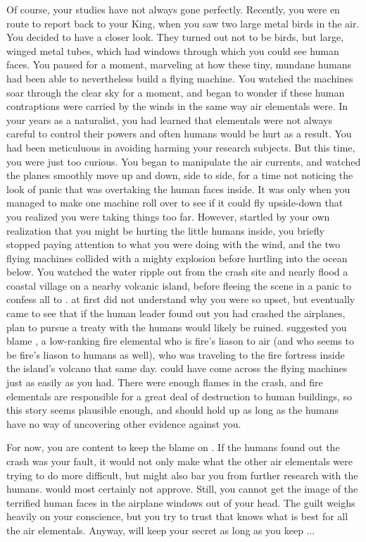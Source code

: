 \documentclass[char]{elementals}
\begin{document}
Of course, your studies have not always gone perfectly.  Recently, you were en route to report back to your King, when you saw two large metal birds in the air.  You decided to have a closer look.  They turned out not to be birds, but large, winged metal tubes, which had windows through which you could see human faces.  You paused for a moment, marveling at how these tiny, mundane humans had been able to nevertheless build a flying machine.  You watched the machines soar through the clear sky for a moment, and began to wonder if these human contraptions were carried by the winds in the same way air elementals were. In your years as a naturalist, you had learned that elementals were not always careful to control their powers and often humans would be hurt as a result.  You had been meticuluous in avoiding harming your research subjects.  But this time, you were just too curious. You began to manipulate the air currents, and watched the planes smoothly move up and down, side to side, for a time not noticing the look of panic that was overtaking the human faces inside.  It was only when you managed to make one machine roll over to see if it could fly upside-down that you realized you were taking things too far.  However, startled by your own realization that you might be hurting the little humans inside, you briefly stopped paying attention to what you were doing with the wind, and the two flying machines collided with a mighty explosion before hurtling into the ocean below.  You watched the water ripple out from the crash site and nearly flood a coastal village on a nearby volcanic island, before fleeing the scene in a panic to confess all to \cKing{}.  \cKing{\They} at first did not understand why you were so upset, but eventually \cKing{\they} came to see that if the human leader found out you had crashed the airplanes, \cKing{\their} plan to pursue a treaty with the humans would likely be ruined.  \cKing{} suggested you blame \cJuliet{\intro}, a low-ranking fire elemental who is fire's liason to air (and who seems to be fire's liason to humans as well), who was traveling to the fire fortress inside the island's volcano that same day. \cJuliet{\They} could have come across the flying machines just as easily as you had.  There were enough flames in the crash, and fire elementals are responsible for a great deal of destruction to human buildings, so this story seems plausible enough, and should hold up as long as the humans have no way of uncovering other evidence against you.  

For now, you are content to keep the blame on \cJuliet{}.  If the humans found out the crash was your fault, it would not only make what the other air elementals were trying to do more difficult, but might also bar you from further research with the humans.  \cDiplomat{} would most certainly not approve.  Still, you cannot get the image of the terrified human faces in the airplane windows out of your head.  The guilt weighs heavily on your conscience, but you try to trust that \cKing{} knows what is best for all the air elementals. Anyway, \cKing{\they} will keep your secret as long as you keep \cKing{\their}...
\end{document}
